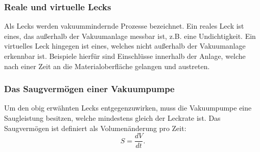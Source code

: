 \subsubsection*{Reale und virtuelle Lecks}
Als Lecks werden vakuummindernde Prozesse bezeichnet. Ein reales Leck ist eines,
das außerhalb der Vakuumanlage messbar ist, z.B. eine Undichtigkeit. Ein virtuelles
Leck hingegen ist eines, welches nicht außerhalb der Vakuumanlage erkennbar ist.
Beispiele hierfür sind Einschlüsse innerhalb der Anlage, welche nach einer Zeit an
die Materialoberfläche gelangen und austreten.

\subsubsection*{Das Saugvermögen einer Vakuumpumpe}
Um den obig erwähnten Lecks entgegenzuwirken, muss die Vakuumpumpe eine Saugleistung
besitzen, welche mindestens gleich der Leckrate ist. Das Saugvermögen ist definiert
als Volumenänderung pro Zeit:
\begin{equation}
 S = \frac{dV}{dt}.
\end{equation}
